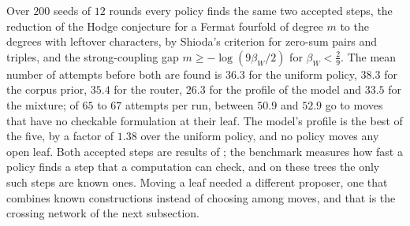 Over $200$ seeds of $12$ rounds every policy finds the same two accepted steps, the reduction of the Hodge conjecture for a Fermat fourfold of degree $m$ to the degrees with leftover characters, by Shioda's criterion for zero-sum pairs and triples, and the strong-coupling gap $m\ge-\log(9\beta_{W}/2)$ for $\beta_{W}<\frac29$. The mean number of attempts before both are found is $36.3$ for the uniform policy, $38.3$ for the corpus prior, $35.4$ for the router, $26.3$ for the profile of the model and $33.5$ for the mixture; of $65$ to $67$ attempts per run, between $50.9$ and $52.9$ go to moves that have no checkable formulation at their leaf. The model's profile is the best of the five, by a factor of $1.38$ over the uniform policy, and no policy moves any open leaf. Both accepted steps are results of \cite{BB26c,BB26d}; the benchmark measures how fast a policy finds a step that a computation can check, and on these trees the only such steps are known ones. Moving a leaf needed a different proposer, one that combines known constructions instead of choosing among moves, and that is the crossing network of the next subsection.





